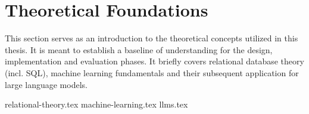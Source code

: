 \section{Theoretical Foundations}

This section serves as an introduction to the theoretical concepts utilized in this thesis. It is meant to establish a
baseline of understanding for the design, implementation and evaluation phases. It briefly covers relational database theory
(incl. SQL), machine learning fundamentals and their subsequent application for large language models.

{relational-theory.tex}
{machine-learning.tex}
{llms.tex}












